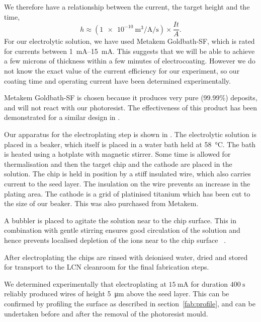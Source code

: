 We therefore have a relationship between the current, the target height and the
time,
%
\begin{equation}
  h \approx \left(
  \SI[per-mode=fraction]{1e-10}{\meter\cubed\per\ampere\per\second} \right)
  \times\frac{It}{A}.
\end{equation}
%
For our electrolytic solution, we have used Metakem Goldbath-SF, which
is rated for currents between \SIrange{1}{15}{\milli\ampere}. This suggests
that we will be able to achieve a few microns of thickness within a few minutes
of electrocoating. However we do not know the exact value of the current
efficiency for our experiment, so our coating time and operating current have
been determined experimentally.
%

Metakem Goldbath-SF is chosen because it produces very pure (99.99\%) deposits,
and will not react with our photoresist. The effectiveness of this product has
been demonstrated for a similar design in .

Our apparatus for the electroplating step is shown in
. The electrolytic solution is placed in a
beaker, which itself is placed in a water bath held at \SI{58}{\celsius}. The
bath is heated using a hotplate with magnetic stirrer. Some time is allowed for
thermalisation and then the target chip and the cathode are placed in the
solution. The chip is held in position by a stiff insulated wire, which also
carries current to the seed layer. The insulation on the wire prevents an
increase in the plating area.  The cathode is a grid of platinised titanium
which has been cut to the size of our beaker. This was also purchased from
Metakem.

A bubbler is placed to agitate the solution near to the chip surface. This in
combination with gentle stirring ensures good circulation of the solution and
hence prevents localised depletion of the ions near to the chip
surface~\cite{Schlesinger2011} .

After electroplating the chips are rinsed with deionised water, dried and stored
for transport to the LCN cleanroom for the final fabrication steps.

We determined experimentally that electroplating at $\SI{15}{\milli\ampere}$
for duration $\SI{400}{\second}$ reliably produced wires of height
\SI{5}{\micro\meter} above the seed layer. This can be confirmed by profiling
the surface as described in section~\ref{fab:profile}, and can be undertaken
before and after the removal of the photoresist mould. 
%

